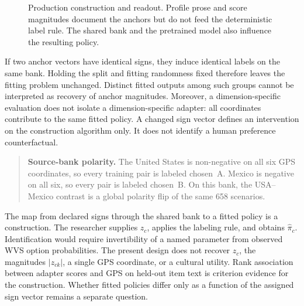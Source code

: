 \begin{figure}[htbp]
\centering
{}
\caption{Production construction and readout. Profile prose and score magnitudes document the anchors but do not feed the deterministic label rule. The shared bank and the pretrained model also influence the resulting policy.}\label{fig:pipeline}
\end{figure}

If two anchor vectors have identical signs, they induce identical labels on the same bank. Holding the split and fitting randomness fixed therefore leaves the fitting problem unchanged. Distinct fitted outputs among such groups cannot be interpreted as recovery of anchor magnitudes. Moreover, a dimension-specific evaluation does not isolate a dimension-specific adapter: all coordinates contribute to the same fitted policy. A changed sign vector defines an intervention on the construction algorithm only. It does not identify a human preference counterfactual.

\begin{quote}\small
\textbf{Source-bank polarity.} The United States is non-negative on all six GPS coordinates, so every training pair is labeled chosen~A. Mexico is negative on all six, so every pair is labeled chosen~B. On this bank, the USA--Mexico contrast is a global polarity flip of the same 658 scenarios.
\end{quote}

The map from declared signs through the shared bank to a fitted policy is a construction. The researcher supplies $z_c$, applies the labeling rule, and obtains $\widehat\pi_c$. Identification would require invertibility of a named parameter from observed WVS option probabilities. The present design does not recover $z_c$, the magnitudes $|z_{ck}|$, a single GPS coordinate, or a cultural utility. Rank association between adapter scores and GPS on held-out item text is criterion evidence for the construction. Whether fitted policies differ only as a function of the assigned sign vector remains a separate question.


